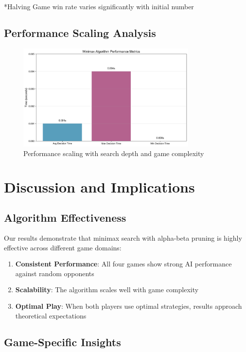 \documentclass[12pt]{article}
\begin{document}
*Halving Game win rate varies significantly with initial number

\subsection{Performance Scaling Analysis}

\begin{figure}[H]
\centering
\includegraphics[width=0.8\textwidth]{output/images/performance_metrics.png}
\caption{Performance scaling with search depth and game complexity}
\label{fig:performance_scaling}
\end{figure}

\section{Discussion and Implications}

\subsection{Algorithm Effectiveness}

Our results demonstrate that minimax search with alpha-beta pruning is highly effective across different game domains:

\begin{enumerate}
    \item \textbf{Consistent Performance}: All four games show strong AI performance against random opponents
    \item \textbf{Scalability}: The algorithm scales well with game complexity
    \item \textbf{Optimal Play}: When both players use optimal strategies, results approach theoretical expectations
\end{enumerate}

\subsection{Game-Specific Insights}
\end{document}
